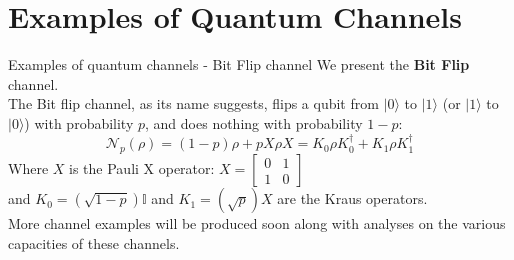 \section{Examples of Quantum Channels}

\begin{frame}{Examples of quantum channels - Bit Flip channel}
    We present the \textbf{Bit Flip} channel.\\
    The Bit flip channel, as its name suggests, flips a qubit from $|0\rangle $ to $|1\rangle $ (or $|1\rangle $ to $|0\rangle $) with probability $p$, and
    does nothing with probability $1-p$:
    \begin{equation}
        \mathcal{N}_p(\rho) = (1-p)\rho + pX\rho X = K_0 \rho K_0^\dagger + K_1 \rho K_1^\dagger
    \end{equation}
    Where $X$ is the Pauli X operator:
    \begin{math}
        X = \begin{bmatrix}
            0 & 1\\
            1 & 0
        \end{bmatrix}
    \end{math}\\
    and $K_0 = (\sqrt{1-p})\mathbb{I} $ and $K_1 = (\sqrt{p})X$ are the Kraus operators.\\

    More channel examples will be produced soon along with analyses on the various capacities of these channels.
\end{frame}
